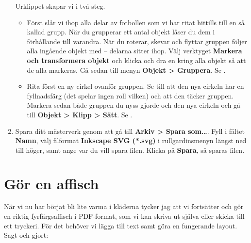 \documentclass[a4paper,final]{memoir} %
\begin{document}
\begin{enumerate}
Urklippet skapar vi i två steg. 

\begin{itemize}

\item Först slår vi ihop alla delar av fotbollen som vi har ritat hittills till en så kallad grupp. När du grupperar ett antal objekt låser du dem i förhållande till varandra. När du roterar, skevar och flyttar gruppen följer alla ingående objekt med -- delarna sitter ihop. Välj verktyget \textbf{Markera och transformera objekt} och klicka och dra en kring alla objekt så att de alla markeras. Gå sedan till menyn \textbf{Objekt \textgreater{} Gruppera}. Se . 


\item Rita först en ny cirkel ovanför gruppen. Se till att den nya cirkeln har en fyllnadsfärg (det spelar ingen roll vilken) och att den täcker gruppen. Markera sedan både gruppen du nyss gjorde och den nya cirkeln och gå till \textbf{Objekt \textgreater{} Klipp \textgreater{} Sätt}. Se .

	
\end{itemize}

\item Spara ditt mästerverk genom att gå till \textbf{Arkiv \textgreater{} Spara som\ldots{}}. Fyll i fältet \textbf{Namn}, välj filformat \textbf{Inkscape SVG (*.svg)} i rullgardinsmenyn längst ned till höger, samt ange var du vill spara filen. Klicka på \textbf{Spara}, så sparas filen.
 
\end{enumerate}


\section{Gör en affisch}

När vi nu har börjat bli lite varma i kläderna tycker jag att vi fortsätter och gör en riktig fyrfärgsaffisch i PDF-format, som vi kan skriva ut själva eller skicka till ett tryckeri. För det behöver vi lägga till text samt göra en fungerande layout. Sagt och gjort:
\end{document}
